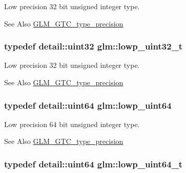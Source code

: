 Low precision 32 bit unsigned integer type. \begin{DoxySeeAlso}{See Also}
\hyperlink{group__gtc__type__precision}{G\-L\-M\-\_\-\-G\-T\-C\-\_\-type\-\_\-precision} 
\end{DoxySeeAlso}
\hypertarget{group__gtc__type__precision_ga9f8cb602a358e1f48bda2682cf051f0c}{
\subsubsection[{lowp\-\_\-uint32\-\_\-t}]{\setlength{\rightskip}{0pt plus 5cm}typedef detail\-::uint32 {\bf glm\-::lowp\-\_\-uint32\-\_\-t}}}\label{group__gtc__type__precision_ga9f8cb602a358e1f48bda2682cf051f0c}
Low precision 32 bit unsigned integer type. \begin{DoxySeeAlso}{See Also}
\hyperlink{group__gtc__type__precision}{G\-L\-M\-\_\-\-G\-T\-C\-\_\-type\-\_\-precision} 
\end{DoxySeeAlso}
\hypertarget{group__gtc__type__precision_gacf666a9d9b309c4615c7a4f2ab0be289}{
\subsubsection[{lowp\-\_\-uint64}]{\setlength{\rightskip}{0pt plus 5cm}typedef detail\-::uint64 {\bf glm\-::lowp\-\_\-uint64}}}\label{group__gtc__type__precision_gacf666a9d9b309c4615c7a4f2ab0be289}
Low precision 64 bit unsigned integer type. \begin{DoxySeeAlso}{See Also}
\hyperlink{group__gtc__type__precision}{G\-L\-M\-\_\-\-G\-T\-C\-\_\-type\-\_\-precision} 
\end{DoxySeeAlso}
\hypertarget{group__gtc__type__precision_gabf3069d4f188557a87b1d7f35eb0a270}{
\subsubsection[{lowp\-\_\-uint64\-\_\-t}]{\setlength{\rightskip}{0pt plus 5cm}typedef detail\-::uint64 {\bf glm\-::lowp\-\_\-uint64\-\_\-t}}}\label{group__gtc__type__precision_gabf3069d4f188557a87b1d7f35eb0a270}
